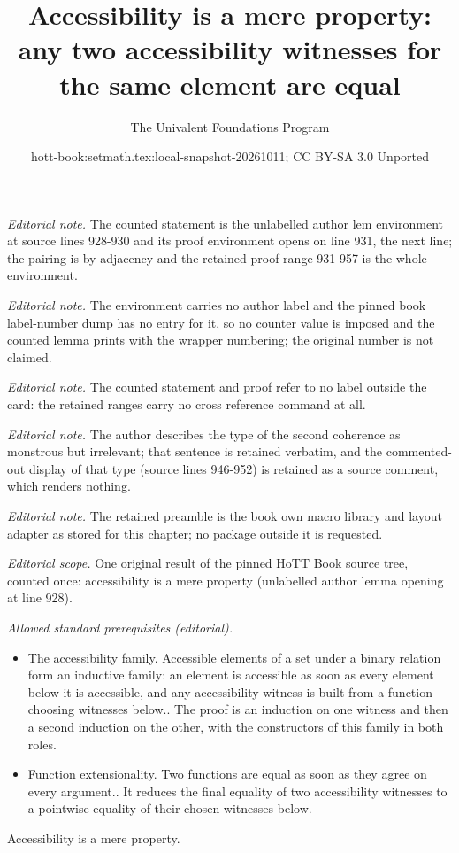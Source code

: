 \documentclass[10pt,a4paper]{article}
\title{Accessibility is a mere property: any two accessibility witnesses for the same element are equal}
\author{The Univalent Foundations Program}
\date{hott-book:setmath.tex:local-snapshot-20261011; CC BY-SA 3.0 Unported}
\newcounter{chapter}
\providecommand{\index}[1]{}
\theoremstyle{definition}
\theoremstyle{remark}
\numberwithin{equation}{section}
\begin{document}
\maketitle
\noindent\textit{Editorial note.} The counted statement is the unlabelled author lem environment at source lines 928-930 and its proof environment opens on line 931, the next line; the pairing is by adjacency and the retained proof range 931-957 is the whole environment.\par\medskip
\noindent\textit{Editorial note.} The environment carries no author label and the pinned book label-number dump has no entry for it, so no counter value is imposed and the counted lemma prints with the wrapper numbering; the original number is not claimed.\par\medskip
\noindent\textit{Editorial note.} The counted statement and proof refer to no label outside the card: the retained ranges carry no cross reference command at all.\par\medskip
\noindent\textit{Editorial note.} The author describes the type of the second coherence as monstrous but irrelevant; that sentence is retained verbatim, and the commented-out display of that type (source lines 946-952) is retained as a source comment, which renders nothing.\par\medskip
\noindent\textit{Editorial note.} The retained preamble is the book own macro library and layout adapter as stored for this chapter; no package outside it is requested.\par\medskip
\noindent\textit{Editorial scope.} One original result of the pinned HoTT Book source tree, counted once: accessibility is a mere property (unlabelled author lemma opening at line 928).\par\medskip
\noindent\textit{Allowed standard prerequisites (editorial).}\begin{itemize}
\item The accessibility family. Accessible elements of a set under a binary relation form an inductive family: an element is accessible as soon as every element below it is accessible, and any accessibility witness is built from a function choosing witnesses below.. The proof is an induction on one witness and then a second induction on the other, with the constructors of this family in both roles.
\item Function extensionality. Two functions are equal as soon as they agree on every argument.. It reduces the final equality of two accessibility witnesses to a pointwise equality of their chosen witnesses below.
\end{itemize}\medskip
\begin{lem}
  Accessibility\index{accessibility} is a mere property.
\end{lem}
\end{document}
